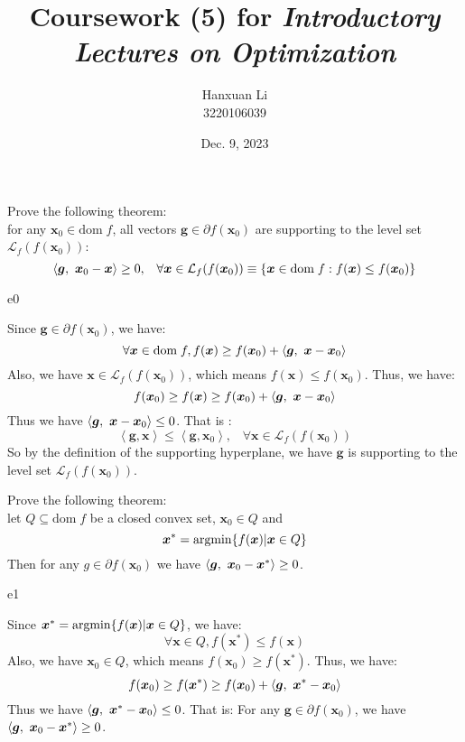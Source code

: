\documentclass{article}
\title{Coursework (5) for \emph{Introductory Lectures on Optimization}}
\author{Hanxuan Li \\ 3220106039}
\date{Dec. 9, 2023}
\newcommand{\xB}{\bm{x}}
\newcommand{\gB}{\bm{g}}
\newcommand{\LM}{\mathcal{L}}
\newcommand{\domf}{\textrm{dom}\;f}
\newcommand{\argmin}{\mathop{\rm argmin}}
\begin{document}
\maketitle

\begin{excercise}\label{e0}
Prove the following theorem: \\
for any $\xB_0 \in \domf$, all vectors $\gB \in \partial f(\xB_0)$ are supporting to the level set $\LM_f (f(\xB_0))$:
\begin{equation}
	\innerproduct{\gB}{\xB_0 - \xB} \geq 0, \;\;\; \forall \xB \in \LM_f(f(\xB_0)) \equiv \{ \xB \in \domf: f(\xB) \leq f(\xB_0) \}
\end{equation}
\end{excercise}
\begin{PROOF}{e0}

Since $\gB \in \partial f(\xB_0)$, we have:
\begin{equation}
	\forall \xB \in \domf, f(\xB)\ge f(\xB_0)+\innerproduct{\gB}{\xB-\xB_0}
\end{equation}
Also, we have $\xB \in \LM_f(f(\xB_0))$, which means $f(\xB) \leq f(\xB_0)$. Thus, we have:
\begin{equation}
	f(\xB_0) \geq f(\xB) \geq f(\xB_0) + \innerproduct{\gB}{\xB - \xB_0}
\end{equation}
Thus we have $\innerproduct{\gB}{\xB - \xB_0} \le 0$. That is :
\begin{equation}
	\left\langle\gB,\xB\right\rangle\le\left\langle\gB,\xB_0\right\rangle,\;\;\;\forall \xB\in\LM_f(f(\xB_0))
\end{equation}
So by the definition of the supporting hyperplane, we have $\gB$ is supporting to the level set $\LM_f (f(\xB_0))$.

\end{PROOF}

\begin{excercise}\label{e1}
Prove the following theorem: \\
let $Q \subseteq \domf$ be a closed convex set,  $\xB_0 \in Q$ and 
 \begin{equation}
 	\xB^* = \argmin \{ f(\xB) | \xB \in Q \}
 \end{equation}
 Then for any $g \in \partial f(\xB_0)$ we have $\innerproduct{\gB}{\xB_0 - \xB^*} \geq 0$.
\end{excercise}
\begin{PROOF}{e1}
	
Since $\xB^* = \argmin \{ f(\xB) | \xB \in Q \}$, we have:
\begin{equation}
	\forall \xB \in Q, f(\xB^*) \leq f(\xB)
\end{equation}
Also, we have $\xB_0 \in Q$, which means $f(\xB_0) \geq f(\xB^*)$. Thus, we have:
\begin{equation}
	f(\xB_0) \geq f(\xB^*) \geq f(\xB_0) + \innerproduct{\gB}{\xB^* - \xB_0}
\end{equation}
Thus we have $\innerproduct{\gB}{\xB^* - \xB_0} \le 0$. That is:
For any $\gB \in \partial f(\xB_0)$, we have $\innerproduct{\gB}{\xB_0 - \xB^*} \geq 0$.

\end{PROOF}
\end{document}
